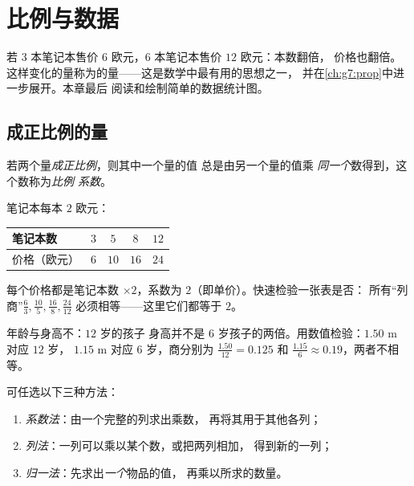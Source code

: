 \chapter{比例与数据}\label{ch:g6:propdata}

若 3 本笔记本售价 $6$ 欧元，6 本笔记本售价 $12$ 欧元：本数翻倍，
价格也翻倍。
这样变化的量称为\emph{}的量——这是数学中最有用的思想之一，
并在\cref{ch:g7:prop}中进一步展开。本章最后
阅读和绘制简单的数据统计图。

\section{成正比例的量}

\begin{definition}[成正比例]\label{def:g6:propdata:def}
若两个量\emph{成正比例}，则其中一个量的值
总是由另一个量的值乘
\emph{同一个}数得到，这个数称为\emph{比例
系数}。
\end{definition}

\begin{example}\label{ex:g6:propdata:table}
笔记本每本 $2$ 欧元：
\begin{center}
\renewcommand{\arraystretch}{1.3}
\begin{tabular}{l|cccc}
笔记本数 & $3$ & $5$ & $8$ & $12$ \\
\hline
价格（欧元） & $6$ & $10$ & $16$ & $24$ \\
\end{tabular}
\end{center}
每个价格都是笔记本数 $\times 2$，系数为
$2$（即单价）。快速检验一张表是否：
所有“列商”$\frac{6}{3}, \frac{10}{5}, \frac{16}{8},
\frac{24}{12}$ 必须相等——这里它们都等于 $2$。
\end{example}

\begin{example}[反例]\label{ex:g6:propdata:nonexample}
年龄与身高不：$12$ 岁的孩子
身高并不是 $6$ 岁孩子的两倍。用数值检验：$1.50$ m 对应 $12$ 岁，
$1.15$ m 对应 $6$ 岁，商分别为 $\frac{1.50}{12} = 0.125$ 和
$\frac{1.15}{6} \approx 0.19$，两者不相等。
\end{example}

\begin{method}[补全比例表]\label{met:g6:propdata:complete}
可任选以下三种方法：
\begin{enumerate}
  \item \emph{系数法}：由一个完整的列求出乘数，
        再将其用于其他各列；
  \item \emph{列法}：一列可以乘以某个数，或把两列相加，
        得到新的一列；
  \item \emph{归一法}：先求出\emph{一个}物品的值，
        再乘以所求的数量。
\end{enumerate}
\end{method}

